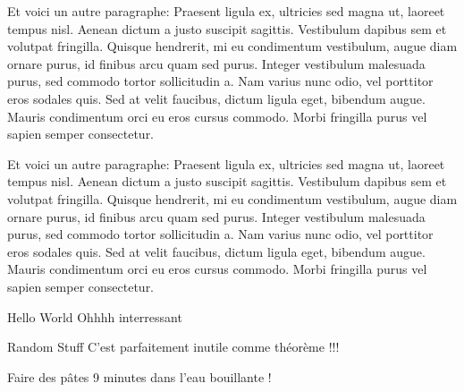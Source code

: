 \documentclass{lecture}
\begin{document}
\begin{example}[]{}
    Et voici un autre paragraphe: Praesent ligula ex, ultricies sed magna ut,
    laoreet tempus nisl. Aenean dictum a justo suscipit sagittis. Vestibulum dapibus
    sem et volutpat fringilla. Quisque hendrerit, mi eu condimentum vestibulum,
    augue diam ornare purus, id finibus arcu quam sed purus. Integer vestibulum
    malesuada purus, sed commodo tortor sollicitudin a. Nam varius nunc odio, vel
    porttitor eros sodales quis. Sed at velit faucibus, dictum ligula eget, bibendum
    augue. Mauris condimentum orci eu eros cursus commodo. Morbi fringilla purus vel
    sapien semper consectetur. 

    Et voici un autre paragraphe: Praesent ligula ex, ultricies sed magna ut,
    laoreet tempus nisl. Aenean dictum a justo suscipit sagittis. Vestibulum dapibus
    sem et volutpat fringilla. Quisque hendrerit, mi eu condimentum vestibulum,
    augue diam ornare purus, id finibus arcu quam sed purus. Integer vestibulum
    malesuada purus, sed commodo tortor sollicitudin a. Nam varius nunc odio, vel
    porttitor eros sodales quis. Sed at velit faucibus, dictum ligula eget, bibendum
    augue. Mauris condimentum orci eu eros cursus commodo. Morbi fringilla purus vel
    sapien semper consectetur. 
\end{example}


\begin{hardexercise}[]{Hello World}
    Ohhhh interressant
\end{hardexercise}


\begin{theorem}[]{Random Stuff}
    C'est parfaitement inutile comme théorème !!!
\end{theorem}


\begin{method}[]{Faire des pâtes}
    9 minutes dans l'eau bouillante !
\end{method}
\end{document}
